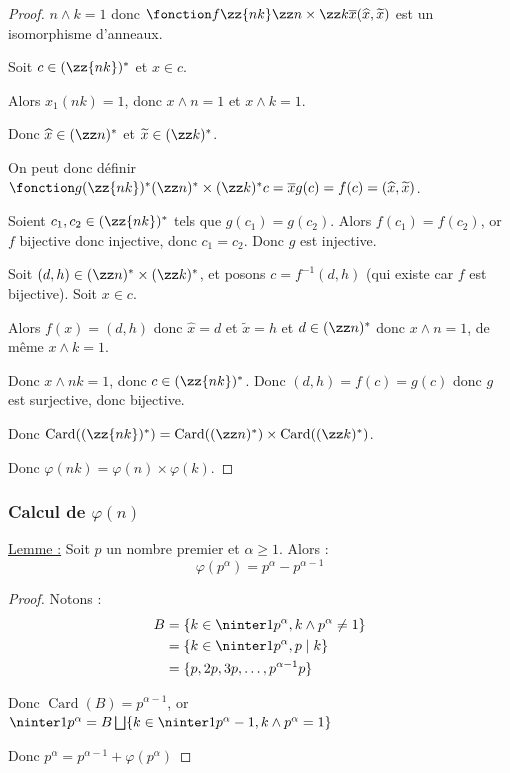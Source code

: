 \begin{proof}
    $n \wedge k = 1$ donc $\fonction f {\zz {nk}}{\zz n \times \zz k}{\overline x}{(\widehat x, \widetilde x)}$ est un isomorphisme d'anneaux.

    Soit $c \in (\zz{nk})^*$ et $x \in c$. 

    Alors $x_1(nk) = 1$, donc $x \wedge n = 1$ et $x \wedge k = 1$.

    Donc $\widehat x  \in (\zz n)^*$ et $\widetilde x \in (\zz k)^*$.

    On peut donc définir $\fonction g {(\zz {nk})^*}{(\zz n)^* \times (\zz k)^*}{c = \overline x}{g(c) = f(c) = (\widehat x, \widetilde x)}$.

    Soient $c_1, c_2 \in (\zz{nk})^*$ tels que $g(c_1) = g(c_2)$. Alors 
    $f(c_1) = f(c_2)$, or $f$ bijective donc injective, donc $c_1 = c_2$. Donc $g$ est injective.

    Soit $(d, h) \in (\zz n)^* \times (\zz k)^*$, et posons $c = f^{-1}(d, h)$ (qui existe car $f$ 
    est bijective). Soit $x \in c$.

    Alors $f(x) = (d, h)$ donc $\widehat x = d $ et $\widetilde x = h$ et 
    $d \in (\zz n)^*$ donc $x \wedge n = 1$, de même $x \wedge k = 1$.

    Donc $x \wedge nk = 1$, donc $c \in (\zz {nk})^*$. Donc $(d, h) = f(c) = g(c)$ donc 
    $g$ est surjective, donc bijective.

    Donc $\operatorname{Card}((\zz {nk})^*) = \operatorname{Card}((\zz n)^*) \times \operatorname{Card}((\zz k)^*)$.

    Donc $\varphi(nk) = \varphi(n) \times \varphi(k)$.
\end{proof}

\subsubsection{Calcul de $\varphi(n)$}

\uline{Lemme :} Soit $p$ un nombre premier et $\alpha \geqslant 1$. Alors :
\[\varphi(p^\alpha) = p^\alpha - p^{\alpha - 1}\]

\begin{proof}
    Notons :
    \begin{align*}
        B & = \{k \in \ninter 1 {p^\alpha}, k \wedge p^\alpha \neq 1\} \\
        & = \{k \in \ninter 1 {p^\alpha}, p \mid k\} \\
        & = \{p, 2p, 3p, \ldots, p^{\alpha - 1} p\} \\
    \end{align*} 

    Donc $\operatorname{Card}(B) = p^{\alpha - 1}$, or $\ninter 1 {p^\alpha} = B \bigsqcup \{k \in \ninter 1 {p^\alpha - 1}, k \wedge p^\alpha = 1\}$
    
    Donc $p^\alpha = p^{\alpha - 1} + \varphi(p^\alpha)$
\end{proof}

